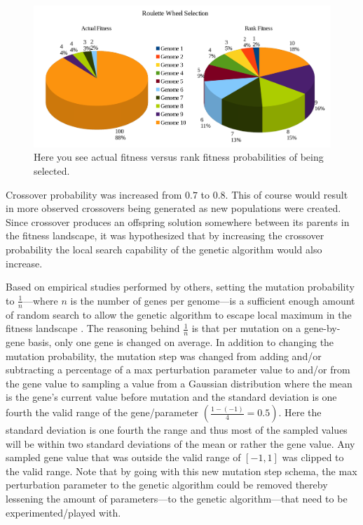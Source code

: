 \documentclass[a4paper,10pt]{article}
\begin{document}
\begin{figure}[H]  
  \centering
  \includegraphics[width=1\textwidth]{figures/roulette.png}
  \caption{Here you see actual fitness versus rank fitness probabilities of being selected.}
  \label{fig:roulette}
\end{figure}

Crossover probability was increased from $0.7$ to $0.8$. This of course would result in more observed crossovers being generated as new populations were created. Since crossover produces an offspring solution  somewhere between its parents in the fitness landscape, it was hypothesized that by increasing the crossover probability the local search capability of the genetic algorithm would also increase.

Based on empirical studies performed by others, setting the mutation probability to $\frac{1}{n}$---where $n$ is the number of genes per genome---is a sufficient enough amount of random search to allow the genetic algorithm to escape local maximum in the fitness landscape \cite{predictive_models}. The reasoning behind $\frac{1}{n}$ is that per mutation on a gene-by-gene basis, only one gene is changed on average. In addition to changing the mutation probability, the mutation step was changed from adding and/or subtracting a percentage of a max perturbation parameter value to and/or from the gene value to sampling a value from a Gaussian distribution where the mean is the gene's current value before mutation and the standard deviation is one fourth the valid range of the gene/parameter $\left (\frac{1-(-1)}{4}=0.5 \right )$. Here the standard deviation is one fourth the range and thus most of the sampled values will be within two standard deviations of the mean or rather the gene value. Any sampled gene value that was outside the valid range of $[-1,1]$ was clipped to the valid range. Note that by going with this new mutation step schema, the max perturbation parameter to the genetic algorithm could be removed thereby lessening the amount of parameters---to the genetic algorithm---that need to be experimented/played with. 
\end{document}
